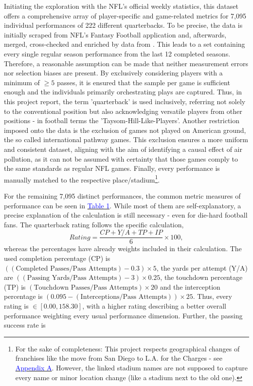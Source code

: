 \documentclass[12pt,a4paper]{article}
\newcommand{\mylink}[2]{\hyperref[#1]{\textcolor{blue}{#2}}}
\begin{document}
Initiating the exploration with the NFL's official weekly statistics, this dataset offers a comprehensive array of player-specific and game-related metrics for 7,095 individual performances of 222 different quarterbacks. To be precise, the data is initially scraped from NFL's Fantasy Football application and, afterwards, merged, cross-checked and enriched by data from \citeauthor{Stathead}. This leads to a set containing every single regular season performance from the last 12 completed seasons. Therefore, a reasonable assumption can be made that neither measurement errors nor selection biases are present. By exclusively considering players with a minimum of $\geq 5$ passes, it is ensured that the sample per game is sufficient enough and the individuals primarily orchestrating plays are captured. Thus, in this project report, the term 'quarterback' is used inclusively, referring not solely to the conventional position but also acknowledging versatile players from other positions - in football terms the 'Taysom-Hill-Like-Players'. Another restriction imposed onto the data is the exclusion of games not played on American ground, the so called international pathway games. This exclusion ensures a more uniform and consistent dataset, aligning with the aim of identifying a causal effect of air pollution, as it can not be assumed with certainty that those games comply to the same standards as regular NFL games. Finally, every performance is manually matched to the respective place/stadium\footnote{For the sake of completeness: This project respects geographical changes of franchises like the move from San Diego to L.A. for the Charges - see \mylink{AppF:1}{Appendix A}. However, the linked stadium names are not supposed to capture every name or minor location change (like a stadium next to the old one).}. 

For the remaining 7,095 distinct performances, the common metric measures of performance can be seen in \mylink{tab:1}{Table 1}. While most of them are self-explanatory, a precise explanation of the calculation is still necessary - even for die-hard football fans. The quarterback rating follows the specific calculation, 
\begin{equation}
Rating = \dfrac{CP + Y/A + TP + IP}{6} \times 100,
\end{equation}
whereas the percentages have already weights included in their calculation. The used completion percentage (CP) is $ ((\textrm{Completed Passes} / \textrm{Pass Attempts}) - 0.3) \times 5$, the yards per attempt (Y/A) are $((\textrm{Passing Yards} / \textrm{Pass Attempts}) - 3) \times 0.25$, the touchdown percentage (TP) is $(\textrm{Touchdown Passes} / \textrm{Pass Attempts}) \times 20$ and the interception percentage is $(0.095 - (\textrm{Interceptions} / \textrm{Pass Attempts})) \times 25$. Thus, every rating is $ \in [ 0.00 ,158.30 ]$, with a higher rating describing a better overall performance weighting every usual performance dimension. Further, the passing success rate is 
\end{document}
